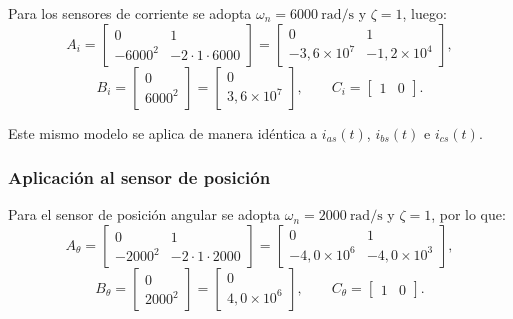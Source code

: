 \documentclass[12pt, a4paper,journal, onecolumn, compsoc]{IEEEtran}
\begin{document}
Para los sensores de corriente se adopta $\omega_n=6000\ \text{rad/s}$ y $\zeta=1$, luego:
\begin{equation}
    A_i=
    \begin{bmatrix}
        0 & 1 \\
        -6000^2 & -2\cdot 1 \cdot 6000
    \end{bmatrix}
    =
    \begin{bmatrix}
        0 & 1 \\
        -3{,}6\times 10^7 & -1{,}2\times 10^4
    \end{bmatrix},
\end{equation}
\begin{equation}
    B_i=
    \begin{bmatrix}
        0 \\
        6000^2
    \end{bmatrix}
    =
    \begin{bmatrix}
        0 \\
        3{,}6\times 10^7
    \end{bmatrix},
    \qquad
    C_i=
    \begin{bmatrix}
        1 & 0
    \end{bmatrix}.
\end{equation}

Este mismo modelo se aplica de manera idéntica a $i_{as}(t)$, $i_{bs}(t)$ e $i_{cs}(t)$.

\subsubsection*{Aplicación al sensor de posición}

Para el sensor de posición angular se adopta $\omega_n=2000\ \text{rad/s}$ y $\zeta=1$, por lo que:
\begin{equation}
    A_\theta=
    \begin{bmatrix}
        0 & 1 \\
        -2000^2 & -2\cdot 1 \cdot 2000
    \end{bmatrix}
    =
    \begin{bmatrix}
        0 & 1 \\
        -4{,}0\times 10^6 & -4{,}0\times 10^3
    \end{bmatrix},
\end{equation}
\begin{equation}
    B_\theta=
    \begin{bmatrix}
        0 \\
        2000^2
    \end{bmatrix}
    =
    \begin{bmatrix}
        0 \\
        4{,}0\times 10^6
    \end{bmatrix},
    \qquad
    C_\theta=
    \begin{bmatrix}
        1 & 0
    \end{bmatrix}.
\end{equation}
\end{document}
